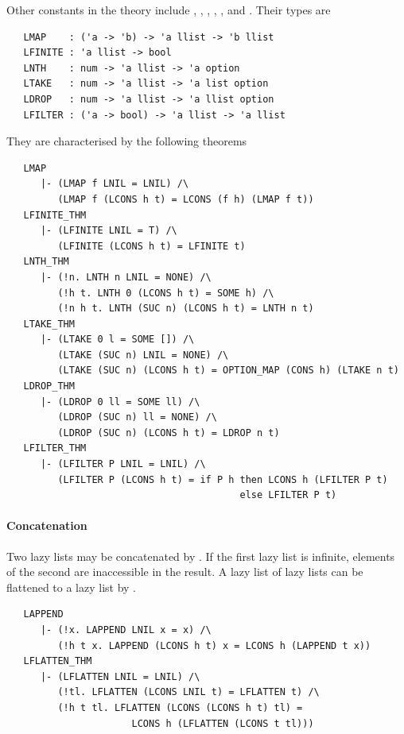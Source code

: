 {Other constants in the theory  include , ,
, , , and . Their types are
%
\begin{hol}
\begin{verbatim}
   LMAP    : ('a -> 'b) -> 'a llist -> 'b llist
   LFINITE : 'a llist -> bool
   LNTH    : num -> 'a llist -> 'a option
   LTAKE   : num -> 'a llist -> 'a list option
   LDROP   : num -> 'a llist -> 'a llist option
   LFILTER : ('a -> bool) -> 'a llist -> 'a llist
\end{verbatim}
\end{hol}
They are characterised by the following theorems
\begin{hol}
\begin{verbatim}
   LMAP
      |- (LMAP f LNIL = LNIL) /\
         (LMAP f (LCONS h t) = LCONS (f h) (LMAP f t))
   LFINITE_THM
      |- (LFINITE LNIL = T) /\
         (LFINITE (LCONS h t) = LFINITE t)
   LNTH_THM
      |- (!n. LNTH n LNIL = NONE) /\
         (!h t. LNTH 0 (LCONS h t) = SOME h) /\
         (!n h t. LNTH (SUC n) (LCONS h t) = LNTH n t)
   LTAKE_THM
      |- (LTAKE 0 l = SOME []) /\
         (LTAKE (SUC n) LNIL = NONE) /\
         (LTAKE (SUC n) (LCONS h t) = OPTION_MAP (CONS h) (LTAKE n t)
   LDROP_THM
      |- (LDROP 0 ll = SOME ll) /\
         (LDROP (SUC n) ll = NONE) /\
         (LDROP (SUC n) (LCONS h t) = LDROP n t)
   LFILTER_THM
      |- (LFILTER P LNIL = LNIL) /\
         (LFILTER P (LCONS h t) = if P h then LCONS h (LFILTER P t)
                                         else LFILTER P t)
\end{verbatim}
\end{hol}

\paragraph{Concatenation}

Two lazy lists may be concatenated by . If the first lazy
list is infinite, elements of the second are inaccessible in the
result.  A lazy list of lazy lists can be flattened to a lazy list by
\ml{LFLATTEN}.
\begin{hol}\begin{verbatim}
   LAPPEND
      |- (!x. LAPPEND LNIL x = x) /\
         (!h t x. LAPPEND (LCONS h t) x = LCONS h (LAPPEND t x))
   LFLATTEN_THM
      |- (LFLATTEN LNIL = LNIL) /\
         (!tl. LFLATTEN (LCONS LNIL t) = LFLATTEN t) /\
         (!h t tl. LFLATTEN (LCONS (LCONS h t) tl) =
                      LCONS h (LFLATTEN (LCONS t tl)))
\end{verbatim}\end{hol}

}
